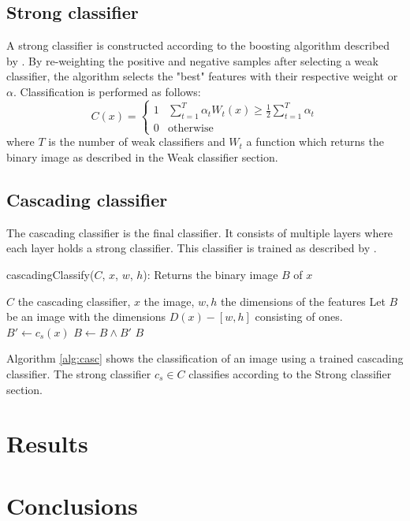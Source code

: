 \documentclass[a4paper,11pt]{article}
\begin{document}
\subsection*{Strong classifier}
A strong classifier is constructed according to the boosting algorithm
described by \cite{viola}.  By re-weighting the positive and
negative samples after selecting a weak classifier, the algorithm selects the
"best" features with their respective weight or $\alpha$. Classification is
performed as follows:
\begin{displaymath}
C(x) = 
	\left\{ \begin{array}{ll}
		1 & \sum^T_{t=1} \alpha_t W_t(x) \ge \frac{1}{2} \sum^T_{t=1}\alpha_t \\
		0 & \textrm{otherwise}
	\end{array} \right.
\end{displaymath}
where $T$ is the number of weak classifiers and $W_t$ a function which returns
the binary image as described in the Weak classifier section.

\subsection*{Cascading classifier}
The cascading classifier is the final classifier. It consists of multiple
layers where each layer holds a strong classifier. This classifier is
trained as described by \cite{viola}. 
\begin{algorithm}
	\caption{cascadingClassify($C$, $x$, $w$, $h$): Returns the binary image $B$ of $x$}
	\begin{algorithmic}[1]
	\REQUIRE $C$ the cascading classifier, $x$ the image, $w,h$ the dimensions of the features
	\medskip
	\STATE Let $B$ be an image with the dimensions $D(x) - [w,h]$ consisting of ones.
		\STATE $B' \leftarrow c_s(x)$
		\STATE $B \leftarrow B \land B'$
	\ENDFOR
	\RETURN $B$
	\end{algorithmic}
\label{alg:casc}
\end{algorithm}
Algorithm \ref{alg:casc} shows the classification of an image using a trained
cascading classifier. The strong classifier $c_s \in C$ classifies according to
the Strong classifier section.

\section*{Results}

\section*{Conclusions}

\renewcommand\bibname{References}


\end{document}
